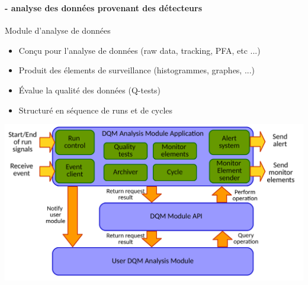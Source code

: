 \documentclass[8pt]{beamer}
\begin{document}
    \begin{frame}
    \frametitle{\secname}
    \framesubtitle{\subsecname - analyse des données provenant des détecteurs}
      \begin{minipage}{0.78\textwidth}
        \begin{block}{Module d'analyse de données}
          \begin{itemize}
            \item Conçu pour l'analyse de données (raw data, tracking, PFA, etc ...)
            \item Produit des élements de surveillance (histogrammes, graphes, ...)
            \item Évalue la qualité des données (Q-tests)
            \item Structuré en séquence de runs et de cycles
          \end{itemize}
        \end{block}
        \begin{center}
          \includegraphics[width=\linewidth]{AnalysisModuleApplicationDiagram.pdf}
        \end{center}
      \end{minipage} \hfill
      \begin{minipage}{0.18\textwidth}
        \begin{flushright}
\end{flushright}
\end{minipage}
\end{frame}
\end{document}

